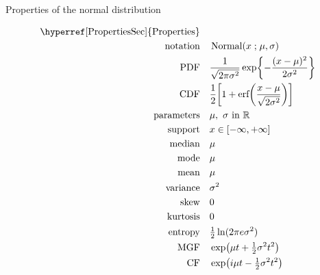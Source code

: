 

\begin{table*}[t!]
\caption[Normal distribution -- Properties]{Properties of the normal distribution}

\begin{align*}
\text{\hyperref[PropertiesSec]{Properties}}  \quad& \\
\text{notation} \quad & \op{Normal}(x\given \mu,\sigma)	\checked
\\
\text{PDF}\quad &   \frac{1}{\sqrt{2 \pi \sigma^2}}  \exp\Left\{ - \frac{( x-\mu)^2}{2\sigma^2} \Right\} \checked
\\
\text{CDF} \quad  &   \frac{1}{2}\Left[  1 + \text{erf}\Left(\frac{x-\mu}{\sqrt{2 \sigma^2}} \Right) \Right]	\checked
\\
\text{parameters}\quad &   \mu,\ \sigma \text{ in } \mathbb{R}						\checked
\\
\text{support} \quad &   x \in [-\infty, + \infty]									\checked
\\
\text{median} \quad  &  \mu												\checked
\\
\text{mode} \quad  & \mu													\checked
\\
\text{mean} \quad  &  \mu													\checked
\\
\text{variance} \quad  & \sigma^2											\checked
\\
\text{skew} \quad  &  0													\checked
\\
\text{kurtosis} \quad  &  0													\checked
\\	
\text{entropy} \quad  & \tfrac{1}{2} \ln(2\pi e \sigma^2)							\checked
\\
\text{MGF} \quad  &  \exp\Left({\mu t + \tfrac{1}{2} \sigma^2 t^2 }\Right)				\checked
\\
\text{CF} \quad  &  \exp\Left({i \mu t - \tfrac{1}{2} \sigma^2 t^2}\Right)					\checked
\end{align*}

\end{table*}
